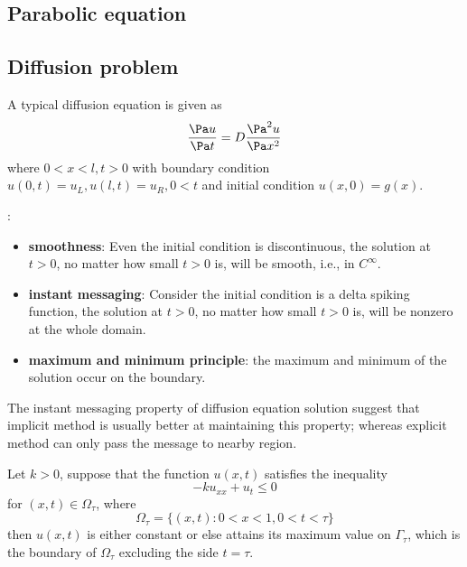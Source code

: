 \begin{refsection}
\section{Parabolic equation}
\subsection{Diffusion problem}
\begin{definition}
	A typical diffusion equation is given as
	$$\frac{\Pa u}{\Pa t} = D\frac{\Pa^2 u}{\Pa x^2 }$$
	where $0<x<l,t>0$ with boundary condition $u(0,t) = u_L,u(l,t)=u_R,0<t$ and initial condition $u(x,0) = g(x)$.
\end{definition}


\begin{remark}:
\begin{itemize}
	\item \textbf{smoothness}: Even the initial condition is discontinuous, the solution at $t>0$, no matter how small $t>0$ is, will be smooth, i.e., in $C^\infty$.
	\item \textbf{instant messaging}: Consider the initial condition is a delta spiking function, the solution at $t>0$, no matter how small $t>0$ is, will be nonzero at the whole domain. 
	\item \textbf{maximum and minimum principle}: the maximum and minimum of the solution occur on the boundary.
\end{itemize}	
\end{remark}




\begin{remark}
	The instant messaging property of diffusion equation solution suggest that implicit method is usually better at maintaining this property; whereas explicit method can only pass the message to nearby region. 
\end{remark}

\begin{theorem}\cite[120]{griffiths2015essential}
	Let $k > 0$, suppose that the function $u(x,t)$ satisfies the inequality 
	$$-ku_{xx}+u_t \leq 0$$
	for $(x,t) \in \Omega_{\tau}$, where
	$$\Omega_{\tau} =\{(x,t):0<x<1,0<t<\tau\}$$
	then $u(x,t)$ is either constant or else attains its maximum value on $\Gamma_{\tau}$, which is the boundary of $\Omega_{\tau}$ excluding the side $t= \tau$.
\end{theorem}


\end{refsection}
